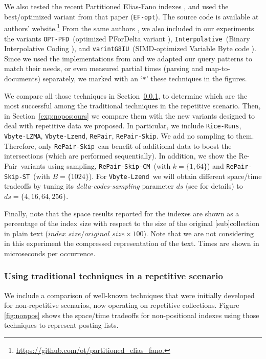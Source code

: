 \documentclass[review]{elsarticle}
\newcommand{\repair}{Re-Pair}
\newcommand{\riceRuns}{\texttt{Rice-Runs}}
\newcommand{\repairNo}{\texttt{RePair}}
\newcommand{\repairSkip}{\texttt{RePair-Skip}}
\newcommand{\repairSkipCM}{\texttt{RePair-Skip-CM}}
\newcommand{\repairSkipST}{\texttt{RePair-Skip-ST}}
\newcommand{\vbyteLZMA}{\texttt{Vbyte-LZMA}}
\newcommand{\vbyteLzend}{\texttt{Vbyte-Lzend}}
\newcommand{\interpolative}{\texttt{Interpolative}}
\newcommand{\efopt}{\texttt{EF-opt}}
\newcommand{\optpfd}{\texttt{OPT-PFD}}
\newcommand{\varint}{\texttt{varintG8IU}}
\begin{document}
We also tested the recent Partitioned Elias-Fano indexes \cite{OV14}, and used the best/optimized variant from that paper (\efopt). The source code is available at authors' website.\footnote{\url{https://github.com/ot/partitioned_elias_fano.}}
From  the same authors \cite{OV14}, we also included in our experiments the variants \optpfd\ (optimized PForDelta variant \cite{YDS09}), \interpolative\ (Binary Interpolative Coding \cite{MS00}), and \varint\ (SIMD-optimized Variable Byte code \cite{Stepanov:2011}). Since we used the implementations from \cite{OV14} and we adapted our query patterns to match their needs, or even measured partial times (parsing and map-to-documents) separately, we marked with an `\texttt{*}' these techniques in the figures. 



We compare all those techniques in Section~\ref{exp:nopos:others}, to determine which are the most successful among the traditional techniques in the repetitive scenario. 
Then, in Section~\ref{exp:nopos:ours} we compare them with the new variants designed to deal with repetitive data we proposed. In particular, we include \riceRuns,
\vbyteLZMA,  \vbyteLzend, \repairNo, \repairSkip. We add no sampling to them. Therefore, only \repairSkip\ can benefit of additional data to boost the intersections (which are performed sequentially). In addition, we show the \repair\ variants using sampling, \repairSkipCM\ (with $k=\{1,64\}$) and \repairSkipST\ (with $B=\{ 1024\}$). For \vbyteLzend\ we will obtain different space/time tradeoffs by tuning its {\em delta-codes-sampling} parameter $ds$ (see \cite{KNtcs12} for details) to $ds=\{4,16,64,256\}$.

Finally, note that the space results reported for the indexes are shown as a percentage 
of the index size with respect to the size of the original [sub]collection in plain text
($index\_size / original\_size \times 100$). Note that we are not considering in
this experiment the compressed representation of the text. 
Times are shown in microseconds per occurrence.



\subsubsection{Using traditional techniques in a repetitive scenario} \label{exp:nopos:others}

We include a comparison of well-known techniques that were initially developed
for non-repetitive scenarios, now operating on repetitive collections.
Figure \ref{fig:nonpos} shows the space/time tradeoffs for 
non-positional indexes using those techniques to represent posting lists. 
\end{document}
